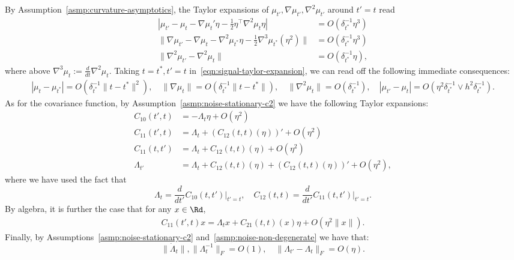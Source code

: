 \documentclass{article}
\begin{document}
	By Assumption~\ref{asmp:curvature-asymptotics}, the Taylor expansions of $\mu_{t'}, \nabla \mu_{t'}, \nabla^2 \mu_{t'}$ around $t'= t$ read
	\begin{equation}
		\begin{aligned}
			\label{eqn:signal-taylor-expansion}
			|\mu_{t'} - \mu_{t} - \nabla \mu_t'\eta - \frac{1}{2}\eta^{\top}\nabla^2\mu_{t}\eta| 
			& = O(\delta_{t^{\ast}}^{-1}\eta^3) \\
			\|\nabla \mu_{t'} - \nabla \mu_t - \nabla^2 \mu_{t^*} \eta - \frac{1}{2}\nabla^3\mu_{t^*}(\eta^2)\| 
			& = O(\delta_{t^{\ast}}^{-1}\eta^{3}) \\
			\|\nabla^2 \mu_{t'} - \nabla^2 \mu_{t}\| 
			& = O(\delta_{t^{\ast}}^{-1} \eta),
		\end{aligned}
	\end{equation}
	where above $\nabla^3 \mu_{t} := \frac{d}{dt}\nabla^2 \mu_t$. Taking $t = t^*, t' = t$ in~\eqref{eqn:signal-taylor-expansion}, we can read off the following immediate consequences:
	\begin{align}
		\label{eqn:signal-1st-and-2nd-derivative-control}
		|\mu_t - \mu_{t^*}| = O(\delta_{t^*}^{-1} \|t - t^{*}\|^2), \quad \|\nabla \mu_{t}\| = O( \delta_{t^{\ast}}^{-1} \|t - t^*\|), \quad
		\|\nabla^2 \mu_{t}\| = O(\delta_{t^{\ast}}^{-1}), \quad |\mu_{t'} - \mu_t| = O(\eta^2 \delta_{t^*}^{-1} \vee h^2 \delta_{t^*}^{-1}).
	\end{align}
	As for the covariance function, by Assumption~\ref{asmp:noise-stationary-c2} we have the following Taylor expansions:
	\begin{equation}
		\label{eqn:covariance-taylor-expansion}
		\begin{aligned}
			C_{10}(t',t) & = -\Lambda_t \eta + O(\eta^2) \\
			C_{11}(t',t) & = \Lambda_t + (C_{12}(t,t)(\eta))' + O(\eta^2) \\
			C_{11}(t,t') & = \Lambda_t + C_{12}(t,t)(\eta) + O(\eta^2) \\
			\Lambda_{t'} & = \Lambda_t + C_{12}(t,t)(\eta) + (C_{12}(t,t)(\eta))' + O(\eta^2),
		\end{aligned}
	\end{equation}
	where we have used the fact that
	$$
	\Lambda_{t} = \frac{d}{dt'} C_{10}(t,t') \Big|_{t' = t}, \quad C_{12}(t,t) = \frac{d}{dt'} C_{11}(t,t')  \Big|_{t' = t}.
	$$ 
	By algebra, it is further the case that for any $x \in \Rd$,
	\begin{equation}
		\begin{aligned}
			\label{eqn:covariance-taylor-expansion-2}
			C_{11}(t',t)x = \Lambda_tx + C_{21}(t,t)(x)\eta + O(\eta^2\|x\|).
		\end{aligned}
	\end{equation}
	Finally, by Assumptions~\ref{asmp:noise-stationary-c2} and~\ref{asmp:noise-non-degenerate} we have that:
	\begin{equation}
		\label{eqn:variance-control}
		\|\dot{\Lambda}_t\|, \|\Lambda_{t}^{-1}\|_F = O(1), \quad \|\Lambda_{t'} - \Lambda_{t}\|_F = O(\eta).
	\end{equation}
	
\end{document}
